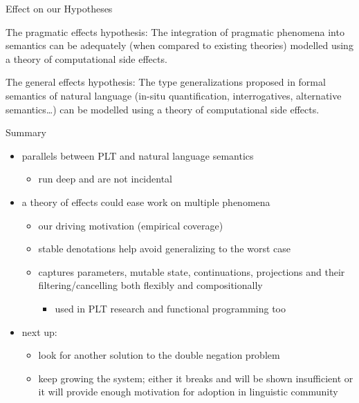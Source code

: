 \documentclass{beamer}
\newcommand{\cmark}{\ding{51}}%
\newcommand{\xmark}{\ding{55}}%
\begin{document}
\begin{frame}{Effect on our Hypotheses}
  \begin{block}{The pragmatic effects hypothesis:}
  The integration of pragmatic phenomena into semantics can be adequately
  (when compared to existing theories) modelled using a theory of
  computational side effects.
  
  \uncover<2->{\begin{flushright}\textcolor{green}{\cmark}\end{flushright}}
  \end{block}
  \vfill
  \begin{block}{The general effects hypothesis:}
  The type generalizations proposed in formal semantics of natural language
  (in-situ quantification, interrogatives, alternative semantics\ldots) can
  be modelled using a theory of computational side effects.

  \uncover<3->{\begin{flushright}\textcolor{red}{\xmark}\end{flushright}}
  \end{block}
\end{frame}





\begin{frame}{Summary}
  \begin{itemize}
  \item parallels between PLT and natural language semantics
    \begin{itemize}
    \item run deep and are not incidental
    \end{itemize}
   \vfill
   \pause
  \item a theory of effects could ease work on multiple phenomena
    \begin{itemize}
    \item our driving motivation (empirical coverage)
    \item stable denotations help avoid generalizing to the worst case
    \item captures parameters, mutable state, continuations, projections
      and their filtering/cancelling both flexibly and compositionally
      \begin{itemize}
      \item used in PLT research and functional programming too
      \end{itemize}
    \end{itemize}
    \vfill
    \pause
  \item next up:
    \begin{itemize}
    \item look for another solution to the double negation problem
    \item keep growing the system; either it breaks and will be shown
      insufficient or it will provide enough motivation for adoption in
      linguistic community
    \end{itemize}
  \end{itemize}
\end{frame}
\end{document}
